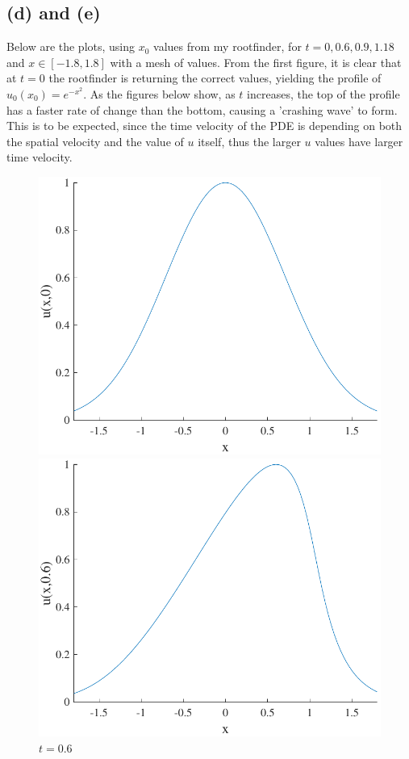 \documentclass{article}
\begin{document}
\subsection*{(d) and (e)}
Below are the plots, using $x_0$ values from my rootfinder, for $t = 0, 0.6, 0.9, 1.18$ and $x \in [-1.8, 1.8]$ with a mesh of values. From the first figure, it is clear that at $t=0$ the rootfinder is returning the correct values, yielding the profile of $u_0(x_0) = e^{-x^2}$. As the figures below show, as $t$ increases, the top of the profile has a faster rate of change than the bottom, causing a 'crashing wave' to form. This is to be expected, since the time velocity of the PDE is depending on both the spatial velocity and the value of $u$ itself, thus the larger $u$ values have larger time velocity.
\begin{figure}[H]
  \centering
  \begin{minipage}[b]{0.49\textwidth}
    \includegraphics[width=\textwidth]{hw_13_plot2.pdf}
    \caption{$t = 0$}

  \end{minipage}
  \hfill
  \begin{minipage}[b]{0.49\textwidth}
    \includegraphics[width=\textwidth]{hw_13_plot3.pdf}
    \caption{$t = 0.6$}


\end{minipage}
\end{figure}
\end{document}
